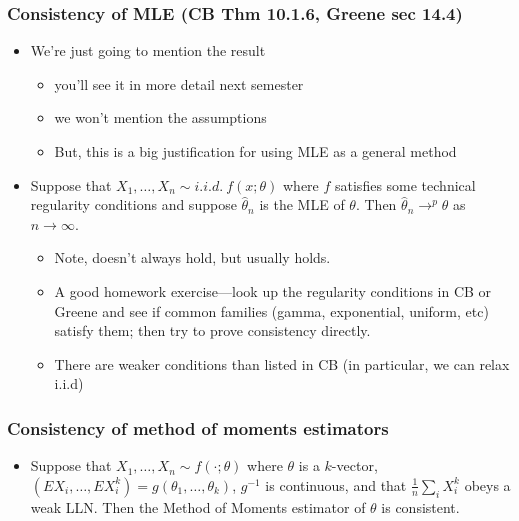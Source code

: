 \documentclass[11pt]{article}
\begin{document}
\subsubsection{Consistency of MLE (CB Thm 10.1.6, Greene sec 14.4)}
\label{sec-1-6-3}

\begin{itemize}
\item We're just going to mention the result
\begin{itemize}
\item you'll see it in more detail next semester
\item we won't mention the assumptions
\item But, this is a big justification for using MLE as a general method
\end{itemize}
\item Suppose that $X_1,\dots,X_n \sim i.i.d.\ f(x; \theta)$ where
        $f$ satisfies some technical regularity conditions and suppose
        $\hat\theta_n$ is the MLE of $\theta$.  Then $\hat\theta_n
        \to^p \theta$ as $n \to \infty$.
\begin{itemize}
\item Note, doesn't always hold, but usually holds.
\item A good homework exercise---look up the regularity conditions
          in CB or Greene and see if common families (gamma,
          exponential, uniform, etc) satisfy them; then try to prove consistency
          directly.
\item There are weaker conditions than listed in CB (in particular,
          we can relax i.i.d)
\end{itemize}
\end{itemize}
\subsubsection{Consistency of method of moments estimators}
\label{sec-1-6-4}

\begin{itemize}
\item Suppose that $X_1,\dots,X_n \sim f(\cdot; \theta)$ where
        $\theta$ is a $k$-vector, $(E X_i,\dots,E X_i^k) =
        g(\theta_1,\dots,\theta_k)$, $g^{-1}$ is continuous, and that
        $\frac{1}{n} \sum_i X_i^k$ obeys a weak LLN.  Then the Method
        of Moments estimator of $\theta$ is consistent.
\end{itemize}
\end{document}
